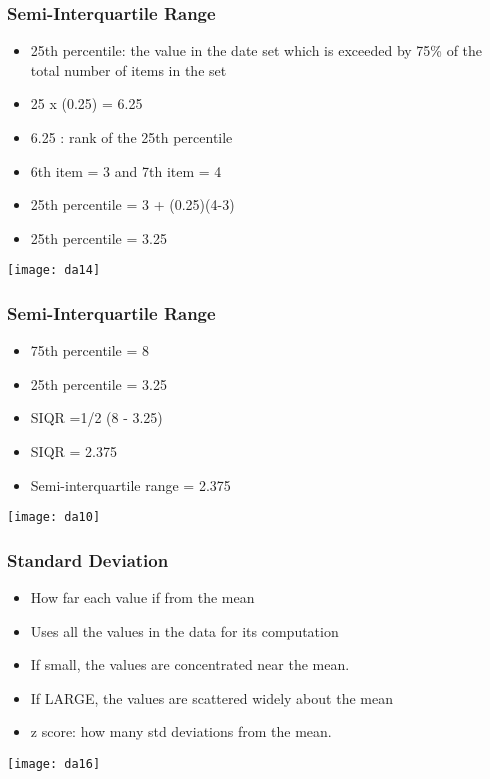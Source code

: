 \begin{frame}[fragile]\frametitle{Semi-Interquartile Range}	
\begin{itemize}
\item 25th percentile: the value in the date set which is exceeded by 75\% of the total number of items in the set
\item 25 x (0.25) = 6.25
\item 6.25 : rank of the 25th percentile
\item 6th item = 3 and 7th item = 4
\item 25th percentile = 3 + (0.25)(4-3)
\item 25th percentile = 3.25
\end{itemize}
\begin{center}
\texttt{[image: da14]}
\end{center}
\end{frame}


\begin{frame}[fragile]\frametitle{Semi-Interquartile Range}	
\begin{itemize}
\item 75th percentile = 8
\item 25th percentile = 3.25
\item SIQR =1/2 (8 - 3.25)
\item SIQR = 2.375
\item Semi-interquartile range = 2.375
\end{itemize}

\begin{center}
\texttt{[image: da10]}
\end{center}
\end{frame}



\begin{frame}[fragile]\frametitle{Standard Deviation}	
\begin{itemize}
\item How far each value if from the mean
\item Uses all the values in the data for its computation
\item If small, the values are concentrated near the mean.
\item If LARGE, the values are scattered widely about the mean
\item z score: how many std deviations from the mean.
\end{itemize}
\begin{center}
\texttt{[image: da16]}
\end{center}
\end{frame}


